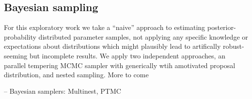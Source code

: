\documentclass[aps,showpacs,twocolumn,prd,superscriptaddress,nofootinbib]{revtex4-1}
\newcommand{\be}{\begin{equation}}
\newcommand{\ee}{\end{equation}}
\newcommand\calA{{\mathcal{A}}}
\newcommand\varphiL{{\varphi_{L}}}
\newcommand\psiL{{\psi_{L}}}
\newcommand{\jgb}[1]{{\color{DarkGreen} #1}}
\begin{document}
%
%



\subsection{Bayesian sampling}
\label{sec:samplers}

For this exploratory work we take a ``naive'' approach to  estimating posterior-probability distributed parameter samples, not applying any specific knowledge or expectations about distributions which might plausibly lead to artifically robust-seeming but incomplete results.  We apply two independent approaches, an parallel tempering MCMC sampler with generically wtih amotivated proposal distribution, and nested sampling. \jgb{More to come}

-- Bayesian samplers: Multinest, PTMC
\end{document}
